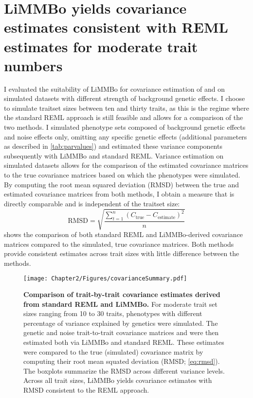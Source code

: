 \section{LiMMBo yields covariance estimates consistent with REML estimates for moderate trait numbers}
\label{section:covariance-limmbo}
I evaluated the suitability of LiMMBo for covariance estimation of  and  on simulated datasets with different strength of background genetic effects. I choose to simulate traitset sizes between ten and thirty traits, as this is the regime where the standard REML approach is still feasible and allows for a comparison of the two methods. I simulated phenotype sets composed of background genetic effects  and noise effects \tmat{\Psi} only, omitting any specific genetic effects (additional parameters as described in \cref{tab:parvalues}) and estimated these variance components subsequently with LiMMBo and standard REML. Variance estimation on simulated datasets allows for the comparison of the estimated covariance matrices to the true covariance matrices based on which the phenotypes were simulated. By computing the root mean squared deviation (RMSD) between the true and estimated covariance matrices from both methods, I obtain a measure that is directly comparable and is independent of the traitset size: 
\begin{equation}
\text{RMSD}=\sqrt{\frac{\sum_{t=1}^n (C_{\text{true}} - C_{\text{estimate}})^2}{n}}
\label{eq:rmsd}
\end{equation}
 shows the comparison of both standard REML and LiMMBo-derived covariance matrices compared to the simulated, true covariance matrices. Both methods provide consistent estimates across trait sizes with little difference between the methods.

\begin{figure}[hbtp]
	\centering	
	\texttt{[image: Chapter2/Figures/covarianceSummary.pdf]}\\
	\caption[\textbf{Comparison of trait-by-trait covariance estimates derived from standard REML and LiMMBo.}]{\textbf{Comparison of trait-by-trait covariance estimates derived from standard REML and LiMMBo.} For moderate trait set sizes ranging from \num{10} to \num{30} traits, phenotypes with different percentage of variance explained by genetics were simulated. The genetic and noise trait-to-trait covariance matrices  and  were then estimated both via LiMMBo and standard REML. These estimates were compared to the true (simulated) covariance matrix by computing their root mean squated deviation (RMSD; \cref{eq:rmsd}). The boxplots summarize the RMSD across different variance levels. Across all trait sizes, LiMMBo yields covariance estimates with RMSD consistent to the REML approach.}
	  \label{fig:covsimilarity}%
\end{figure}

